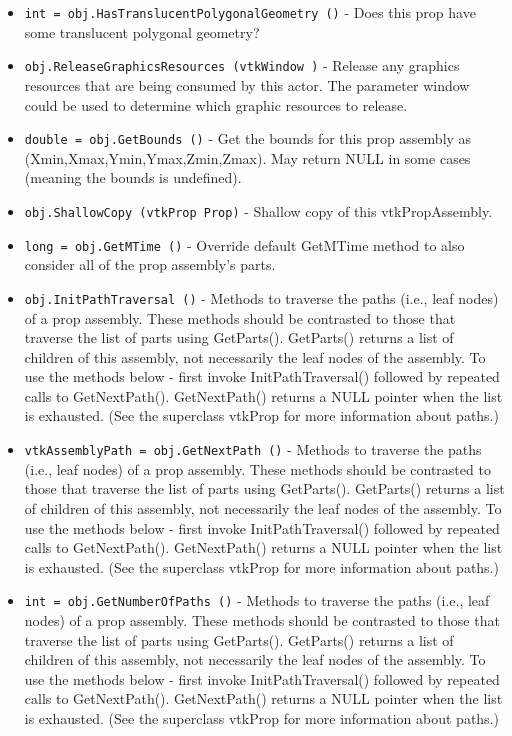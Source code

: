 \begin{itemize}
\item  \verb|int = obj.HasTranslucentPolygonalGeometry ()| -  Does this prop have some translucent polygonal geometry?

\item  \verb|obj.ReleaseGraphicsResources (vtkWindow )| -  Release any graphics resources that are being consumed by this actor.
 The parameter window could be used to determine which graphic
 resources to release.

\item  \verb|double = obj.GetBounds ()| -  Get the bounds for this prop assembly as (Xmin,Xmax,Ymin,Ymax,Zmin,Zmax).
 May return NULL in some cases (meaning the bounds is undefined).

\item  \verb|obj.ShallowCopy (vtkProp Prop)| -  Shallow copy of this vtkPropAssembly.

\item  \verb|long = obj.GetMTime ()| -  Override default GetMTime method to also consider all of the
 prop assembly's parts.

\item  \verb|obj.InitPathTraversal ()| -  Methods to traverse the paths (i.e., leaf nodes) of a prop
 assembly. These methods should be contrasted to those that traverse the
 list of parts using GetParts().  GetParts() returns a list of children
 of this assembly, not necessarily the leaf nodes of the assembly. To use
 the methods below - first invoke InitPathTraversal() followed by
 repeated calls to GetNextPath().  GetNextPath() returns a NULL pointer
 when the list is exhausted. (See the superclass vtkProp for more
 information about paths.)

\item  \verb|vtkAssemblyPath = obj.GetNextPath ()| -  Methods to traverse the paths (i.e., leaf nodes) of a prop
 assembly. These methods should be contrasted to those that traverse the
 list of parts using GetParts().  GetParts() returns a list of children
 of this assembly, not necessarily the leaf nodes of the assembly. To use
 the methods below - first invoke InitPathTraversal() followed by
 repeated calls to GetNextPath().  GetNextPath() returns a NULL pointer
 when the list is exhausted. (See the superclass vtkProp for more
 information about paths.)

\item  \verb|int = obj.GetNumberOfPaths ()| -  Methods to traverse the paths (i.e., leaf nodes) of a prop
 assembly. These methods should be contrasted to those that traverse the
 list of parts using GetParts().  GetParts() returns a list of children
 of this assembly, not necessarily the leaf nodes of the assembly. To use
 the methods below - first invoke InitPathTraversal() followed by
 repeated calls to GetNextPath().  GetNextPath() returns a NULL pointer
 when the list is exhausted. (See the superclass vtkProp for more
 information about paths.)

\end{itemize}
